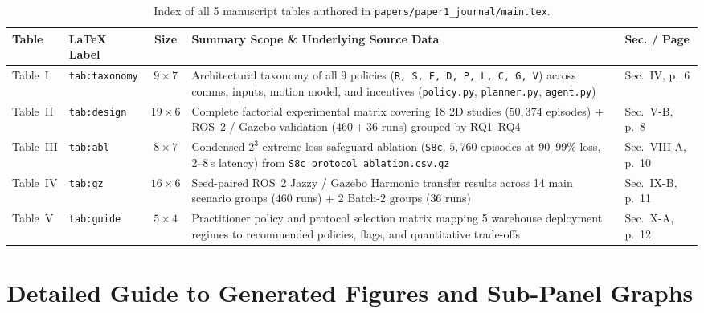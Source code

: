 \documentclass[10pt,a4paper]{article}
\begin{document}
\begin{table}[h!]\centering
\caption{Index of all 5 manuscript tables authored in \texttt{papers/paper1\_journal/main.tex}.}
\footnotesize\setlength{\tabcolsep}{4pt}
\begin{tabularx}{\textwidth}{@{}llc>{\raggedright\arraybackslash}Xl@{}}\toprule
\rowcolor{HdrBg}\textbf{Table} & \textbf{LaTeX Label} & \textbf{Size} & \textbf{Summary Scope \& Underlying Source Data} & \textbf{Sec. / Page} \\\midrule
Table~I & \texttt{tab:taxonomy} & $9\times 7$ & Architectural taxonomy of all 9 policies (\texttt{R, S, F, D, P, L, C, G, V}) across comms, inputs, motion model, and incentives (\texttt{policy.py}, \texttt{planner.py}, \texttt{agent.py}) & Sec.~IV, p.~6 \\
Table~II & \texttt{tab:design} & $19\times 6$ & Complete factorial experimental matrix covering 18 2D studies ($50{,}374$ episodes) + ROS~2 / Gazebo validation ($460+36$ runs) grouped by RQ1--RQ4 & Sec.~V-B, p.~8 \\
Table~III & \texttt{tab:abl} & $8\times 7$ & Condensed $2^3$ extreme-loss safeguard ablation (\texttt{S8c}, $5{,}760$ episodes at 90--99\% loss, 2--8\,s latency) from \texttt{S8c\_protocol\_ablation.csv.gz} & Sec.~VIII-A, p.~10 \\
Table~IV & \texttt{tab:gz} & $16\times 6$ & Seed-paired ROS~2 Jazzy / Gazebo Harmonic transfer results across 14 main scenario groups ($460$ runs) + 2 Batch-2 groups ($36$ runs) & Sec.~IX-B, p.~11 \\
Table~V & \texttt{tab:guide} & $5\times 4$ & Practitioner policy and protocol selection matrix mapping 5 warehouse deployment regimes to recommended policies, flags, and quantitative trade-offs & Sec.~X-A, p.~12 \\\bottomrule
\end{tabularx}
\end{table}

\clearpage
\section{Detailed Guide to Generated Figures and Sub-Panel Graphs}

\end{document}

